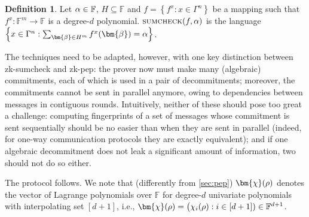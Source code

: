 \documentclass[a4paper,UKenglish,cleveref, autoref, thm-restate]{lipics-v2021}
\theoremstyle{definition}
\newtheorem{definition}[theorem]{Definition}
\newcommand{\field}{\mathbb{F}}
\renewcommand{\set}[1]{\left\{#1\right\}}
\newcommand{\sumcheck}{\normalfont\textsc{sumcheck}\xspace}
\newcommand{\dimension}{m}
\newcommand{\degree}{d}
\newcommand{\evaluationpoint}{\bm{\fe2}}
\newcommand{\cubeside}{H}
\newcommand{\alphabet}{\Gamma}
\def\fe#1{
    \ifnum#1=1
        \alpha
    \else
    \ifnum#1=2
        \beta
    \else
    \ifnum#1=3
        \gamma
    \fi\fi\fi
}
\def\rfe#1{
    \ifnum#1=1
        \rho
    \else
    \ifnum#1=2
        \sigma
    \else
    \fi\fi
}
\begin{document}
\begin{definition}
    \label{def:sumcheck}
    Let $\fe1 \in \field$, $\cubeside \subseteq \field$ and $f = \set{f^x : x \in \alphabet^n}$ be a mapping such that $f^x: \field^\dimension \to \field$ is a degree-$\degree$ polynomial. $\sumcheck(f, \fe1)$ is the language $\set{x \in \alphabet^n : \sum_{\evaluationpoint \in \cubeside^\dimension}f^x(\evaluationpoint) = \fe1}$.
\end{definition}

The techniques need to be adapted, however, with one key distinction between \textsf{zk-sumcheck} and \textsf{zk-pep}: the prover now must make many (algebraic) commitments, each of which is used in a pair of decommitments; moreover, the commitments cannot be sent in parallel anymore, owing to dependencies between messages in contiguous rounds. Intuitively, neither of these should pose too great a challenge: computing fingerprints of a set of messages whose commitment is sent sequentially should be no easier than when they are sent in parallel (indeed, for one-way communication protocols they are exactly equivalent); and if one algebraic decommitment does not leak a significant amount of information, two should not do so either.

The protocol follows. We note that (differently from \cref{sec:pep}) $\bm{\chi}(\rfe1)$ denotes the vector of Lagrange polynomials over $\field$ for degree-$\degree$ univariate polynomials with interpolating set $[\degree + 1]$, i.e., $\bm{\chi}(\rfe1) = \big(\chi_i(\rfe1) : i \in [\degree + 1]) \in \field^{\degree + 1}$.
\end{document}
